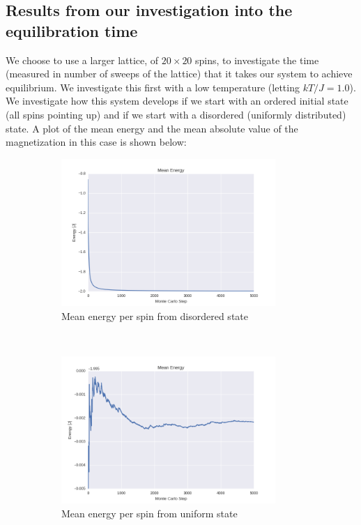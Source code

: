 \documentclass[a4paper, 10pt]{article}
\begin{document}
\subsection{Results from our investigation into the equilibration time}
We choose to use a larger lattice, of $20 \times 20$ spins, to investigate the time (measured in number of sweeps of the lattice) that it takes our system to achieve equilibrium. We investigate this first with a low temperature (letting $kT/J=1.0$). We investigate how this system develops if we start with an ordered initial state (all spins pointing up) and if we start with a disordered (uniformly distributed) state. A plot of the mean energy and the mean absolute value of the magnetization in this case is shown below:
\begin{figure}[!ht]
    \centering
    \begin{subfigure}[H!]{0.5\textwidth}
        \centering
        \includegraphics[height=2.2in]{meanEnergyWRandomStart.png}
        \caption{Mean energy per spin from disordered state}
    \end{subfigure}%
    ~ 
    \begin{subfigure}[H!]{0.5\textwidth}
        \centering
        \includegraphics[height=2.2in]{meanEnergyWUpStart.png}
        \caption{Mean energy per spin from uniform state}
    \end{subfigure}
        ~
     \begin{subfigure}[H!]{0.5\textwidth}

\end{subfigure}
\end{figure}
\end{document}
